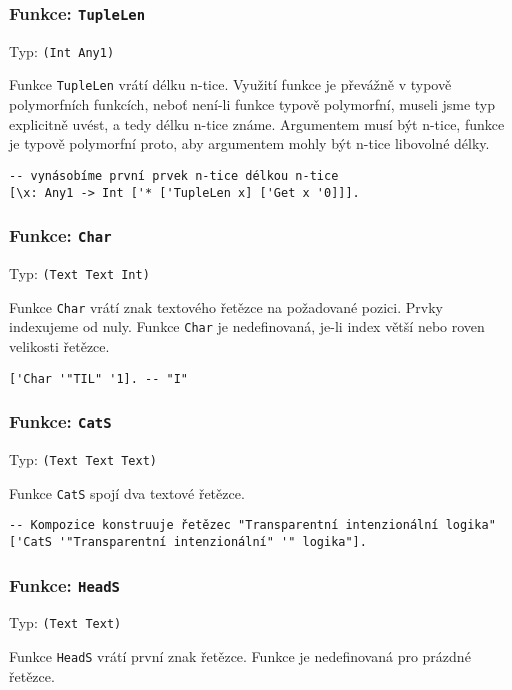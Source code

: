 \subsubsection*{Funkce: \lstinline{TupleLen}}
Typ: \lstinline{(Int Any1)}

Funkce \lstinline{TupleLen} vrátí délku n-tice. Využití funkce je převážně v typově polymorfních
funkcích, neboť není-li funkce typově polymorfní, museli jsme typ explicitně uvést, a tedy délku
n-tice známe. Argumentem musí být n-tice, funkce je typově polymorfní proto, aby argumentem mohly
být n-tice libovolné délky.

\begin{lstlisting}[caption={Ukázka využití TupleLen}]
-- vynásobíme první prvek n-tice délkou n-tice
[\x: Any1 -> Int ['* ['TupleLen x] ['Get x '0]]].
\end{lstlisting}

\subsubsection*{Funkce: \lstinline{Char}}
Typ: \lstinline{(Text Text Int)}

Funkce \lstinline{Char} vrátí znak textového řetězce na požadované pozici. Prvky indexujeme od nuly.
Funkce \lstinline{Char} je nedefinovaná, je-li index větší nebo roven velikosti řetězce.

\begin{lstlisting}[caption={Ukázka využití Char}]
['Char '"TIL" '1]. -- "I"
\end{lstlisting}

\subsubsection*{Funkce: \lstinline{CatS}}
Typ: \lstinline{(Text Text Text)}

Funkce \lstinline{CatS} spojí dva textové řetězce.

\begin{lstlisting}[caption={Ukázka využití Char}]
-- Kompozice konstruuje řetězec "Transparentní intenzionální logika"
['CatS '"Transparentní intenzionální" '" logika"].
\end{lstlisting}

\subsubsection*{Funkce: \lstinline{HeadS}}
Typ: \lstinline{(Text Text)}

Funkce \lstinline{HeadS} vrátí první znak řetězce. Funkce je nedefinovaná pro prázdné řetězce.

